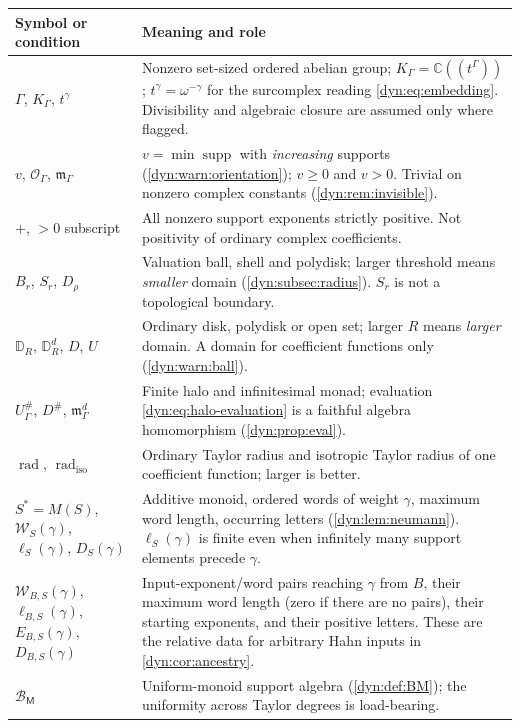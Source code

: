 \documentclass[11pt,letterpaper]{article}
\theoremstyle{definition}
\theoremstyle{remark}
\newcommand{\C}{\mathbb C}
\newcommand{\OO}{\mathcal O}
\newcommand{\BB}{\mathscr B}
\newcommand{\m}{\mathfrak m}
\newcommand{\supp}{\operatorname{supp}}
\newcommand{\rad}{\operatorname{rad}}
\newcommand{\radiso}{\operatorname{rad}_{\mathrm{iso}}}
\newcommand{\word}{\mathcal W}
\numberwithin{equation}{section}
\begin{document}
\begin{longtable}{@{}P{0.22\textwidth}P{0.71\textwidth}@{}}
\toprule
Symbol or condition & Meaning and role\\
\midrule
\endhead
$\Gamma$, $K_\Gamma$, $t^{\gamma}$ & Nonzero set-sized ordered abelian
group; $K_\Gamma=\C((t^{\Gamma}))$; $t^{\gamma}=\omega^{-\gamma}$ for the
surcomplex reading \eqref{dyn:eq:embedding}. Divisibility and algebraic
closure are assumed only where flagged.\\[3pt]
$v$, $\OO_\Gamma$, $\m_\Gamma$ & $v=\min\supp$ with \emph{increasing}
supports (\cref{dyn:warn:orientation}); $v\ge0$ and $v>0$. Trivial on
nonzero complex constants (\cref{dyn:rem:invisible}).\\[3pt]
$+$, $>0$ subscript & All nonzero support exponents strictly positive. Not
positivity of ordinary complex coefficients.\\[3pt]
$B_r$, $S_r$, $D_\rho$ & Valuation ball, shell and polydisk; larger
threshold means \emph{smaller} domain (\cref{dyn:subsec:radius}).
$S_r$ is not a topological boundary.\\[3pt]
$\mathbb D_R$, $\mathbb D_R^{d}$, $D$, $U$ & Ordinary disk, polydisk or
open set; larger $R$ means \emph{larger} domain. A domain for coefficient
functions only (\cref{dyn:warn:ball}).\\[3pt]
$U^{\#}_\Gamma$, $D^{\#}$, $\m_\Gamma^{d}$ & Finite halo and infinitesimal
monad; evaluation \eqref{dyn:eq:halo-evaluation} is a faithful algebra
homomorphism (\cref{dyn:prop:eval}).\\[3pt]
$\rad$, $\radiso$ & Ordinary Taylor radius and isotropic Taylor radius of
one coefficient function; larger is better.\\[3pt]
$S^{*}=M(S)$, $\word_S(\gamma)$, $\ell_S(\gamma)$, $D_S(\gamma)$ &
Additive monoid, ordered words of weight $\gamma$, maximum word length,
occurring letters (\cref{dyn:lem:neumann}). $\ell_S(\gamma)$ is finite even
when infinitely many support elements precede $\gamma$.\\[3pt]
$\word_{B,S}(\gamma)$, $\ell_{B,S}(\gamma)$,
$E_{B,S}(\gamma)$, $D_{B,S}(\gamma)$ &
Input-exponent/word pairs reaching $\gamma$ from $B$, their maximum word
length (zero if there are no pairs), their starting exponents, and their
positive letters. These are the relative data for arbitrary Hahn inputs
in \cref{dyn:cor:ancestry}.\\[3pt]
$\BB_{\mathsf M}$ & Uniform-monoid support algebra
(\cref{dyn:def:BM}); the uniformity across Taylor degrees is
load-bearing.\\[3pt]

\end{longtable}
\end{document}
